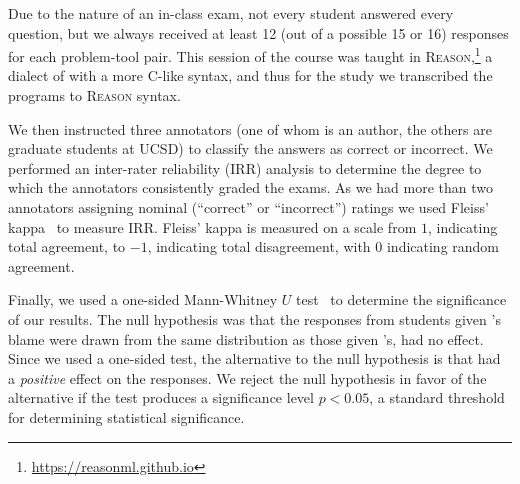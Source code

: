 %
Due to the nature of an in-class exam, not every student answered every
question, but we always received at least 12 (out of a possible 15 or
16) responses for each problem-tool pair.
%
This session of the course
was taught in \textsc{Reason},\footnote{\url{https://reasonml.github.io}}
a dialect of \ocaml with a more C-like syntax, and thus for the study
we transcribed the programs to \textsc{Reason} syntax.

We then instructed three annotators (one of whom is an author, the others
are graduate students at UCSD) to classify the answers as
correct or incorrect.
%
We performed an inter-rater reliability (IRR) analysis to determine the
degree to which the annotators consistently graded the exams.
%
As we had more than two annotators assigning nominal (``correct'' or
``incorrect'') ratings we used Fleiss' kappa~\cite{Fleiss1971-du} to
measure IRR.\@
%
Fleiss' kappa is measured on a scale from $1$, indicating total
agreement, to $-1$, indicating total disagreement, with $0$ indicating
random agreement.

Finally, we used a one-sided Mann-Whitney $U$ test~\cite{Mann1947-fd} to
determine the significance of our results.
%
The null hypothesis was that the responses from students given
\toolname's blame were drawn from the same distribution as those
given \sherrloc's, \ie \toolname had no effect.
%
Since we used a one-sided test, the alternative to the null hypothesis
is that \toolname had a \emph{positive} effect on the responses.
%
We reject the null hypothesis in favor of the alternative if the test
produces a significance level $p < 0.05$, a standard threshold for
determining statistical significance.




